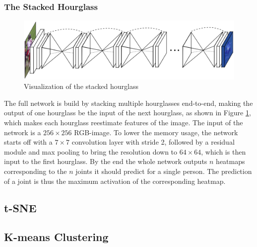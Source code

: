 \documentclass[./main.tex]{subfiles}
\begin{document}
\subsubsection{The Stacked Hourglass}
\begin{figure}[h]
    \centering
    \includegraphics[height = 4 cm]{entities/SHG.png}
    \caption{Visualization of the stacked hourglass \cite{Newell}}
    \label{fig:SHG}
\end{figure}
\noindent The full network is build by stacking multiple hourglasses end-to-end, making the output of one hourglass be the input of the next hourglass, as shown in Figure \ref{fig:SHG}, which makes each hourglass reestimate features of the image. The input of the network is a $256 \times 256$ RGB-image. To lower the memory usage, the network starts off with a $7 \times 7$ convolution layer with stride 2, followed by a residual module and max pooling to bring the resolution down to $64 \times 64$, which is then input to the first hourglass.
By the end the whole network outputs $n$ heatmaps corresponding to the $n$ joints it should predict for a single person. The prediction of a joint is thus the maximum activation of the corresponding heatmap.

\subsection{t-SNE}
\subsection{K-means Clustering}
\end{document}
